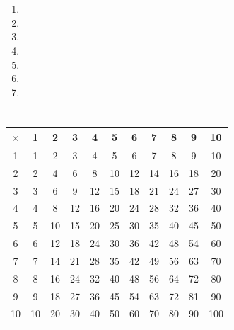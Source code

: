 \documentclass[11pt,a4paper]{book}
\begin{document}
\section{}

\begin{enumerate}[label=\textbf{\ar{جدول} \arabic*:}]
  \item {}
  \item {}
  \item {}
  \item {}
  \item {}
  \item {}
  \item {}
\end{enumerate}

\section{}

\begin{center}
\begin{tabular}{|c|cccccccccc|}
\hline
$\times$ & 1 & 2 & 3 & 4 & 5 & 6 & 7 & 8 & 9 & 10 \\
\hline
1 & 1 & 2 & 3 & 4 & 5 & 6 & 7 & 8 & 9 & 10 \\
2 & 2 & 4 & 6 & 8 & 10 & 12 & 14 & 16 & 18 & 20 \\
3 & 3 & 6 & 9 & 12 & 15 & 18 & 21 & 24 & 27 & 30 \\
4 & 4 & 8 & 12 & 16 & 20 & 24 & 28 & 32 & 36 & 40 \\
5 & 5 & 10 & 15 & 20 & 25 & 30 & 35 & 40 & 45 & 50 \\
6 & 6 & 12 & 18 & 24 & 30 & 36 & 42 & 48 & 54 & 60 \\
7 & 7 & 14 & 21 & 28 & 35 & 42 & 49 & 56 & 63 & 70 \\
8 & 8 & 16 & 24 & 32 & 40 & 48 & 56 & 64 & 72 & 80 \\
9 & 9 & 18 & 27 & 36 & 45 & 54 & 63 & 72 & 81 & 90 \\
10 & 10 & 20 & 30 & 40 & 50 & 60 & 70 & 80 & 90 & 100 \\
\hline
\end{tabular}
\end{center}
\clearpage
\end{document}
